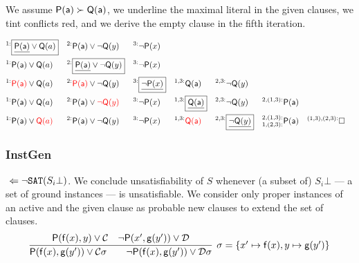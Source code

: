 \begin{example} We assume \( \mathsf{P}(\mathsf{a})\succ\mathsf{Q}(\mathsf{a}) \),
	we underline the maximal literal in the given clauses,
	we tint conflicts red,
	 and we derive the empty clause in the fifth iteration.

	\begin{align*}
	^{1:}&\boxed{\underline{\mP(\ma)}\lor\mQ(a)}
	& ^{2:}&\mP(\ma)\lor\lnot\mQ(y) & ^{3:}&\lnot\mP(x)
	\\
	^{1:}&\mP(\ma)\lor\mQ(a)
	& ^{2:}&\boxed{\underline{\mP(\ma)}\lor\lnot\mQ(y)} & ^{3:}&\lnot\mP(x)
	\\
	^{1:}&{\colLo\mP(\ma)}\lor\mQ(a)
	& ^{2:}&{\colLo\mP(\ma)}\lor\lnot\mQ(y)
	& ^{3:}&\boxed{\underline{\lnot\mP(x)}}
	& ^{1,3:}&\mQ(\ma)
	& ^{2,3:}&\lnot\mQ(y)
	\\
	^{1:}&\mP(\ma)\lor\mQ(a)
	& ^{2:}&\mP(\ma)\lor{\colLo\lnot\mQ(y)}
	& ^{3:}&\lnot\mP(x)
	& ^{1,3:}&\boxed{\underline{\mQ(\ma)}}
	& ^{2,3:}&\lnot\mQ(y)
	& ^{2,(1,3):}&\mP(\ma)
	\\
	^{1:}&\mP(\ma)\lor{\colLo\mQ(a)}
	& ^{2:}&\mP(\ma)\lor\lnot\mQ(y)
	& ^{3:}&\lnot\mP(x)
	& ^{1,3:}&\colLo\mQ(\ma)
	& ^{2,3:}&\boxed{\underline{\lnot\mQ(y)}}
	& ^{2,(1,3):}_{1,(2,3):}&\mP(\ma)
	& ^{(1,3),(2,3):}&\emptyclause
	\\
	\end{align*}
\end{example}

\subsubsection{InstGen}

\jek{} \( \ \Leftarrow \lnot\texttt{SAT}(S_i\bot) \). We conclude unsatisfiability of \( S \) whenever (a subset of) \( S_i\bot \) --- a set of ground instances --- is unsatisfiable.
We consider only proper instances of an active and the given clause as probable new clauses to extend the set of clauses.
\begin{gather*}
	\infer[\sigma=\{ x'\mapsto\mf(x), y\mapsto\mg(y') \}]{
		\mP(\mf(x),\mg(y')) \lor\mcC\sigma
		\qquad
		\lnot\mP(\mf(x),\mg(y'))\lor\mcD\sigma
	}{
		\mP(\mf(x), y) \lor \mcC & \lnot\mP(x',\mg(y')) \lor \mcD
	}
\end{gather*}


